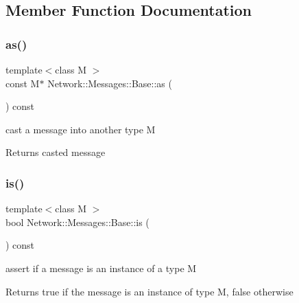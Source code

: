 \subsection{Member Function Documentation}
\mbox{\label{class_network_1_1_messages_1_1_base_a37110b6d836ed5f17e7ee77d9dca5932}} 
\subsubsection{\texorpdfstring{as()}{as()}}
{\footnotesize\ttfamily template$<$class M $>$ \\
const M$\ast$ Network\+::\+Messages\+::\+Base\+::as (\begin{DoxyParamCaption}{ }\end{DoxyParamCaption}) const\hspace{0.3cm}{\ttfamily [inline]}}



cast a message into another type M 

\begin{DoxyReturn}{Returns}
casted message 
\end{DoxyReturn}
\mbox{\label{class_network_1_1_messages_1_1_base_ad1147d97f230c6be6276fdf3668b1d0a}} 
\subsubsection{\texorpdfstring{is()}{is()}}
{\footnotesize\ttfamily template$<$class M $>$ \\
bool Network\+::\+Messages\+::\+Base\+::is (\begin{DoxyParamCaption}{ }\end{DoxyParamCaption}) const\hspace{0.3cm}{\ttfamily [inline]}}



assert if a message is an instance of a type M 

\begin{DoxyReturn}{Returns}
true if the message is an instance of type M, false otherwise 
\end{DoxyReturn}
\mbox{\label{class_network_1_1_messages_1_1_base_a3e344e224eab58146feb8c0136cce46f}} 
